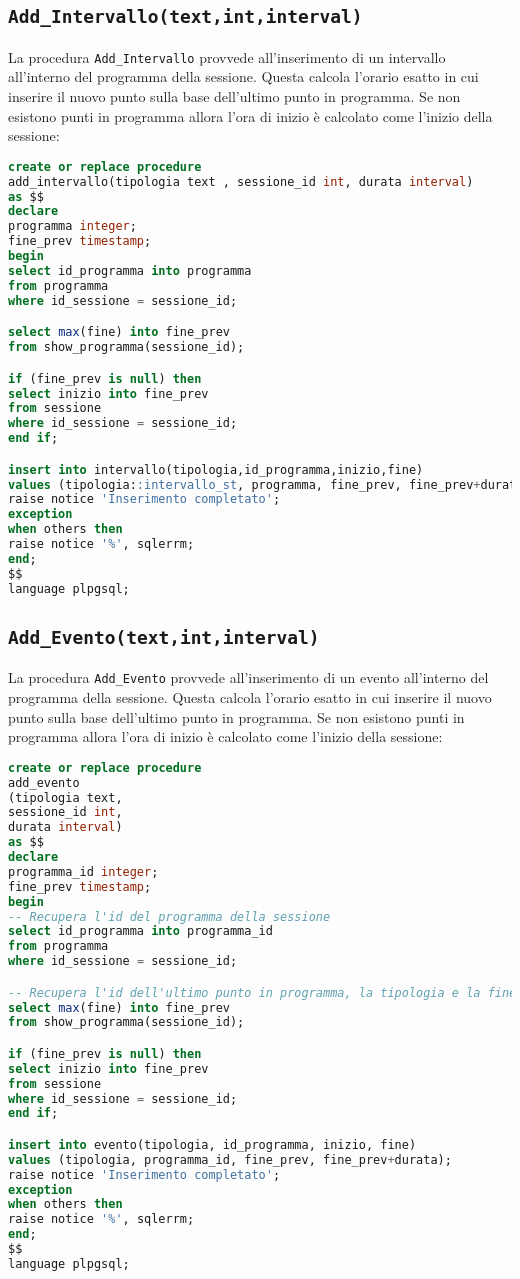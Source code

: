 \subsection{\texttt{Add\_Intervallo(text,int,interval)}}
La procedura \texttt{Add\_Intervallo} provvede all'inserimento di un intervallo all'interno del programma della sessione. Questa calcola l'orario esatto in cui inserire il nuovo punto sulla base dell'ultimo punto in programma. Se non esistono punti in programma allora l'ora di inizio è calcolato come l'inizio della sessione:
\begin{lstlisting}[language=SQL,style=mystyle]
create or replace procedure 
add_intervallo(tipologia text , sessione_id int, durata interval)
as $$
declare
programma integer;
fine_prev timestamp;
begin
select id_programma into programma
from programma
where id_sessione = sessione_id;

select max(fine) into fine_prev
from show_programma(sessione_id);

if (fine_prev is null) then
select inizio into fine_prev
from sessione
where id_sessione = sessione_id;
end if;

insert into intervallo(tipologia,id_programma,inizio,fine)
values (tipologia::intervallo_st, programma, fine_prev, fine_prev+durata);
raise notice 'Inserimento completato';
exception
when others then
raise notice '%', sqlerrm;
end;
$$ 
language plpgsql;
\end{lstlisting}
\subsection{\texttt{Add\_Evento(text,int,interval)}}
La procedura \texttt{Add\_Evento} provvede all'inserimento di un evento all'interno del programma della sessione. Questa calcola l'orario esatto in cui inserire il nuovo punto sulla base dell'ultimo punto in programma. Se non esistono punti in programma allora l'ora di inizio è calcolato come l'inizio della sessione:
\begin{lstlisting}[language=SQL,style=mystyle]
create or replace procedure 
add_evento
(tipologia text, 
sessione_id int, 
durata interval)
as $$
declare
programma_id integer;
fine_prev timestamp;
begin
-- Recupera l'id del programma della sessione
select id_programma into programma_id
from programma
where id_sessione = sessione_id;

-- Recupera l'id dell'ultimo punto in programma, la tipologia e la fine
select max(fine) into fine_prev
from show_programma(sessione_id);

if (fine_prev is null) then
select inizio into fine_prev
from sessione
where id_sessione = sessione_id;
end if;

insert into evento(tipologia, id_programma, inizio, fine)
values (tipologia, programma_id, fine_prev, fine_prev+durata);
raise notice 'Inserimento completato';
exception
when others then
raise notice '%', sqlerrm;
end;
$$
language plpgsql;
\end{lstlisting}
